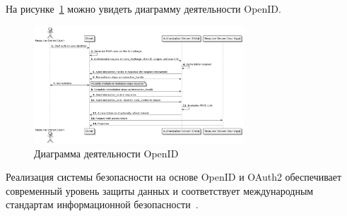 На рисунке~\ref{fig:openid_diagram} можно увидеть диаграмму деятельности OpenID.
\begin{figure}[htbp]
    \centering
    \includegraphics[width=0.7\textwidth]{Dissertation/images/openId_scheme}
    \caption{Диаграмма деятельности OpenID}
    \label{fig:openid_diagram}
\end{figure}

Реализация системы безопасности на основе OpenID и OAuth2 обеспечивает современный уровень защиты данных и соответствует международным стандартам информационной безопасности~\cite{fett2016,19_weingartner2017}.
